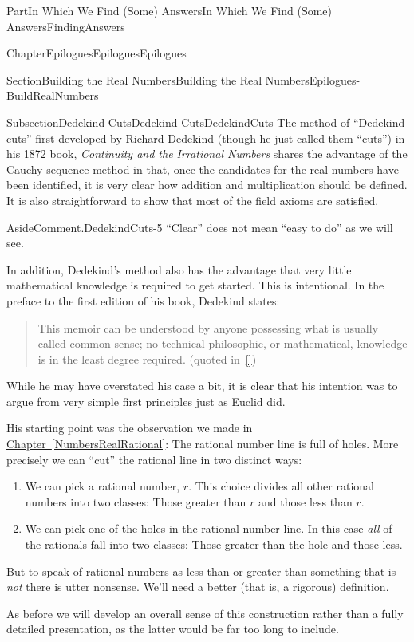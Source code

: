 \documentclass[oneside,10pt,]{book}
\newcommand{\xreffont}{\relax}
\numberwithin{equation}{part}
\begin{document}
\begin{partptx}{Part}{In Which We Find (Some) Answers}{}{In Which We Find (Some) Answers}{}{}{FindingAnswers}
\begin{chapterptx}{Chapter}{Epilogues}{}{Epilogues}{}{}{Epilogues}
\begin{sectionptx}{Section}{Building the Real Numbers}{}{Building the Real Numbers}{}{}{Epilogues-BuildRealNumbers}
\begin{subsectionptx}{Subsection}{Dedekind Cuts}{}{Dedekind Cuts}{}{}{DedekindCuts}
 The method of ``Dedekind cuts'' first developed by Richard Dedekind (though he just called them ``cuts'') in his 1872 book, \emph{Continuity and the Irrational Numbers} shares the advantage of the Cauchy sequence method in that, once the candidates for the real numbers have been identified, it is very clear how addition and multiplication should be defined.  It is also straightforward to show that most of the field axioms are satisfied.%
\begin{aside}{Aside}{Comment.}{DedekindCuts-5}%
``Clear'' does not mean ``easy to do'' as we will see.%
\end{aside}
 In addition, Dedekind's method also has the advantage that very little mathematical knowledge is required to get started.  This is intentional.  In the preface to the first edition of his book, Dedekind states:%
\begin{quote}%
This memoir can be understood by anyone possessing what is usually called common sense; no technical philosophic, or mathematical, knowledge is in the least degree required. (quoted in~\hyperlink{hawking05__god_creat_integ}{[{\xreffont 5}]})%
\end{quote}
While he may have overstated his case a bit, it is clear that his intention was to argue from very simple first principles just as Euclid did.%
\par
His starting point was the observation we made in \hyperref[NumbersRealRational]{Chapter~{\xreffont\ref{NumbersRealRational}}}: The rational number line is full of holes.  More precisely we can ``cut'' the rational line in two distinct ways:%
\begin{enumerate}
\item{}We can pick a rational number, \(r\).  This choice divides all other rational numbers into two classes: Those greater than \(r\) and those less than \(r\).%
\item{}We can pick one of the holes in the rational number line.  In this case \emph{all} of the rationals fall into two classes: Those greater than the hole and those less.%
\end{enumerate}
%
\par
But to speak of rational numbers as less than or greater than something that is \emph{not} there is utter nonsense. We'll need a better (that is, a rigorous) definition.%
\par
As before we will develop an overall sense of this construction rather than a fully detailed presentation, as the latter would be far too long to include.%

\end{subsectionptx}
\end{sectionptx}
\end{chapterptx}
\end{partptx}
\end{document}
